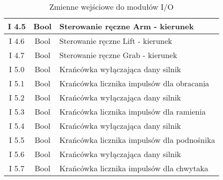 \begin{table}[!htb]
\begin{center}
\begin{tabular}{|c|c| p{10cm} |}
I       4.5 &  Bool   &   Sterowanie ręczne Arm - kierunek           \\\hline                                    
I       4.6 &  Bool   &   Sterowanie ręczne Lift - kierunek                                              \\\hline
I       4.7 &  Bool   &   Sterowanie ręczne Grab - kierunek                                              \\\hline
I       5.0 &  Bool   &   Krańcówka wyłączająca dany silnik                                              \\\hline
I       5.1 &  Bool   &   Krańcówka licznika impulsów dla obracania                                      \\\hline
I       5.2 &  Bool  &    Krańcówka wyłączająca dany silnik                                              \\\hline
I       5.3 &  Bool  &    Krańcówka licznika impulsów dla ramienia                                       \\\hline
I       5.4 &  Bool   &   Krańcówka wyłączająca dany silnik                                              \\\hline
I       5.5 &  Bool   &   Krańcówka licznika impulsów dla podnośnika                                     \\\hline
I       5.6 &  Bool   &   Krańcówka wyłączająca dany silnik                                              \\\hline
I       5.7 &  Bool   &   Krańcówka licznika impulsów dla chwytaka                                       \\\hline
\end{tabular}
\end{center}
\vspace*{-6mm}
  \caption{Zmienne wejściowe do modułów I/O}
	\label{in}
\end{table}
